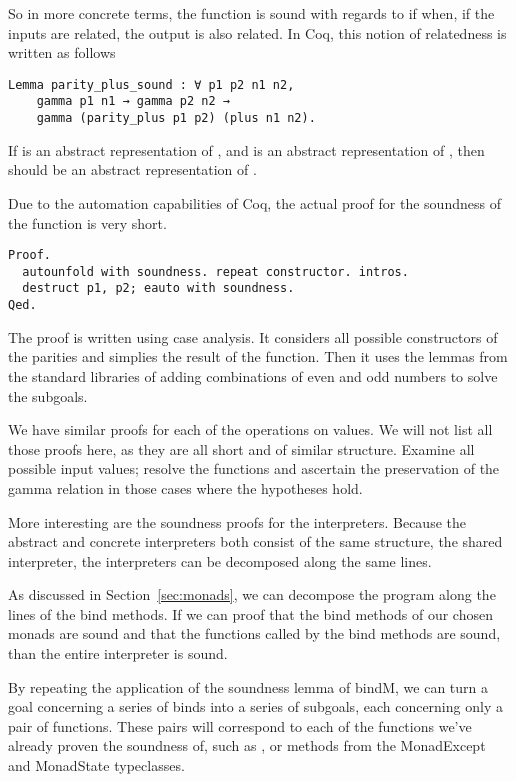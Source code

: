 {So in more concrete terms, the function  is sound with 
regards to 
if when, if the inputs are related, the output is also related. In Coq, this 
notion of relatedness is written as follows

\begin{verbatim}
Lemma parity_plus_sound : ∀ p1 p2 n1 n2, 
    gamma p1 n1 → gamma p2 n2 → 
    gamma (parity_plus p1 p2) (plus n1 n2).
\end{verbatim}

If  is an abstract representation of , and  is an 
abstract representation of , then  should be an 
abstract representation of . 

Due to the automation capabilities of Coq, the actual proof for the soundness
of the  function is very short.

\begin{verbatim}
Proof. 
  autounfold with soundness. repeat constructor. intros.
  destruct p1, p2; eauto with soundness.
Qed.
\end{verbatim}

The proof is written using case analysis. It considers all possible
constructors of the parities and simplies the result of the 
function. Then it uses the lemmas from the standard libraries of adding 
combinations of even and odd numbers to solve the subgoals.

We have similar proofs for each of the operations on values. We will not list
all those proofs here, as they are all short and of similar structure. Examine
all possible input values; resolve the functions and ascertain the preservation
of the gamma relation in those cases where the hypotheses hold.

More interesting are the soundness proofs for the interpreters. Because the
abstract and concrete interpreters both consist of the same structure, the
shared interpreter, the interpreters can be decomposed along the same lines.

As discussed in Section~\ref{sec:monads}, we can decompose the program along
the lines of the bind methods. If we can proof that the bind methods of our
chosen monads are sound and that the functions called by the bind methods are
sound, than the entire interpreter is sound. 

By repeating the application of the soundness lemma of bindM, 
we can turn a goal concerning a series of binds into a series of subgoals, each
concerning only a pair of functions. These pairs will correspond to each of the
functions we've already proven the soundness of, such as , or
methods from the MonadExcept and MonadState typeclasses.

}
